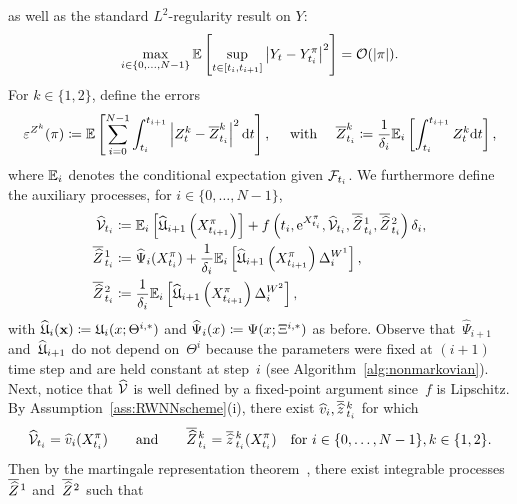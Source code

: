 as well as the standard $L^{2}$-regularity result on $Y$:
\begin{equation}\label{eq:L2regularity}
\max _{i\in\{0, \dots, N-1\}} \mathbb{E}\left[\sup _{t \in\left[t_{i}, t_{i+1}\right]}\left|Y_{t}-Y^\pi_{t_{i}}\right|^{2}\right] = \mathcal{O}(|\pi|).
\end{equation}
For $k\in\{1,2\}$, define the errors
\begin{equation}\label{eq:Z_error}
\varepsilon^{Z^k}(\pi) \coloneqq \mathbb{E}\left[\sum_{i=0}^{N-1} \int_{t_{i}}^{t_{i+1}}\left|Z^k_{t}-\overline{Z}^k_{t_{i}}\right|^{2} \mathrm{d} t\right], \quad \text { with } \quad \overline{Z}^k_{t_{i}} \coloneqq \frac{1}{\delta_{i}} \mathbb{E}_{i}\left[\int_{t_{i}}^{t_{i+1}} Z^k_{t} \mathrm{d} t\right],
\end{equation}
where $\mathbb{E}_{i}$ denotes the conditional expectation given $\mathcal{F}_{t_{i}}$. 
We furthermore define the auxiliary processes, for $i\in\{0, \ldots, {N-1}\}$,
\begin{align}\label{eq:auxilaryProcesses}
\begin{split}
\widehat{\mathcal{V}}_{t_{i}} &\coloneqq \mathbb{E}_{i}\left[\widehat{\mathfrak{U}}_{i+1}\left(X^\pi_{t_{i+1}}\right)\right]+f\left(t_i, \mathrm{e}^{X^\pi_{t_{i}}}, \widehat{\mathcal{V}}_{t_{i}}, \overline{\widehat{Z}}\kern0.1em^{1}_{t_{i}}, \overline{\widehat{Z}}\kern0.1em^{2}_{t_{i}}\right) \delta_{i},  \\
\overline{\widehat{Z}}\kern0.1em^{1}_{t_{i}} &\coloneqq \widehat\Psi_i(X^\pi_{t_i}) + \frac{1}{\delta_{i}} \mathbb{E}_{i}\left[\widehat{\mathfrak{U}}_{i+1}\left(X^\pi_{t_{i+1}}\right) \Delta^{W^1}_{i}\right], \\
\overline{\widehat{Z}}\kern0.1em^{2}_{t_{i}} &\coloneqq \frac{1}{\delta_{i}} \mathbb{E}_{i}\left[\widehat{\mathfrak{U}}_{i+1}\left(X^\pi_{t_{i+1}}\right) \Delta^{W^2}_{i}\right],
\end{split}
\end{align}
with $\widehat{\mathfrak{U}}_i(\boldsymbol{\mathrm{x}})\coloneqq\mathfrak{U}_i(x;\Theta^{i,*})$ and $ \widehat\Psi_i(x)\coloneqq\Psi(x;\Xi^{i,*})$ as before.
Observe that~$\widehat{\Psi}_{i+1}$
and~$\widehat{\mathfrak{U}}_{i+1}$ do not depend on~$\Theta^i$ 
because the parameters were fixed at $(i+1)$ time step and are held constant at step~$i$ 
(see Algorithm~\ref{alg:nonmarkovian}). Next, notice that $\widehat{\mathcal{V}}$ is well defined by a fixed-point argument
since~$f$ is Lipschitz. 
By Assumption~\ref{ass:RWNNscheme}(i), 
there exist $\widehat v_i, \overline{\widehat{z}}\,^{k}_{t_{i}}$ for which
\begin{equation}\label{eq:existenceAuxilary}
    \widehat{\mathcal{V}}_{t_i} = \widehat v_i(X^\pi_{t_i})\qquad \text{and} \qquad \overline{\widehat{Z}}\kern0.1em^{k}_{t_{i}} = \overline{\widehat{z}}\,^{k}_{t_{i}}(X^\pi_{t_i}) \quad \text{for } i\in\{0,\dots,N-1\}, k\in\{1,2\}.
\end{equation}
Then by the martingale representation theorem~\cite[Theorem  14.5.1]{Cohen2015StochasticApplications}, there exist integrable processes~$\overline{\widehat{Z}}\kern0.1em^{1}$ and~$\overline{\widehat{Z}}\kern0.1em^{2}$ such that
